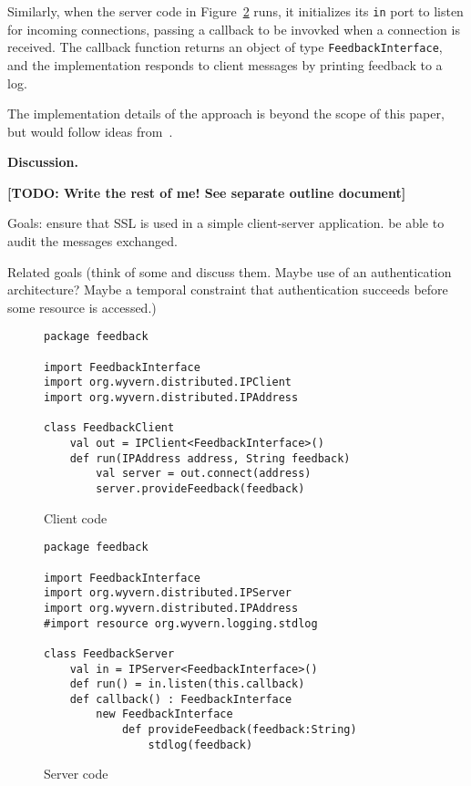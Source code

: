 \documentclass[runningheads]{llncs}
\newcommand{\TODO}[1]{\textbf{[TODO: #1]}}
\newcommand{\minisec}[1]{\vspace{2ex}\noindent\textbf{#1}}
\begin{document}
\begin{sloppypar}
Similarly, when the server code in Figure~\ref{f-server} runs, it initializes its \texttt{in} port to listen for incoming connections, passing a callback to be invovked when a connection is received.  The callback function returns an object of type \texttt{FeedbackInterface}, and the implementation responds to client messages by printing feedback to a log.

The implementation details of the approach is beyond the scope of this paper, but would follow ideas from~\cite{ArchJava-connectors,TSLs-ECOOP14}.

\minisec{Discussion.}  

\TODO{Write the rest of me!  See separate outline document}



Goals: ensure that SSL is used in a simple client-server application.  be able to audit the messages exchanged.

Related goals (think of some and discuss them.  Maybe use of an authentication architecture?  Maybe a temporal constraint that authentication succeeds before some resource is accessed.)




\begin{figure}[t]
\begin{lstlisting}
package feedback

import FeedbackInterface
import org.wyvern.distributed.IPClient
import org.wyvern.distributed.IPAddress

class FeedbackClient
    val out = IPClient<FeedbackInterface>()
    def run(IPAddress address, String feedback)
        val server = out.connect(address)
        server.provideFeedback(feedback)
\end{lstlisting}
\caption{Client code}
\label{f-client}
\end{figure}

\begin{figure}[t]
\begin{lstlisting}
package feedback

import FeedbackInterface
import org.wyvern.distributed.IPServer
import org.wyvern.distributed.IPAddress
#import resource org.wyvern.logging.stdlog

class FeedbackServer
    val in = IPServer<FeedbackInterface>()
    def run() = in.listen(this.callback)
    def callback() : FeedbackInterface
        new FeedbackInterface
            def provideFeedback(feedback:String)
                stdlog(feedback)

\end{lstlisting}
\caption{Server code}
\label{f-server}
\end{figure}






\end{sloppypar}
\end{document}
